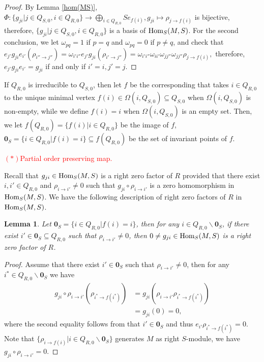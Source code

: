 \documentclass[a4paper, reqno]{amsart}
\newtheorem{lem}[thm]{Lemma}
\theoremstyle{definition}
\theoremstyle{remark}
\numberwithin{equation}{section}
\begin{document}
\begin{proof}
    By Lemma \ref{hom(MS)}, $\Phi: \{g_{ji}|j\in Q_{S,0},i \in Q_{R,0}\}\to \bigoplus_{i\in Q_{R,0}} Se_{f(i)}, g_{ji}\mapsto \rho_{j\to f(i)}$ is bijective, therefore, $\{g_{ji}|j\in Q_{S,0},i \in Q_{R,0}\}$ is a basis of $\textup{Hom}_S(M,S)$. For the second conclusion, we let $ \omega_{pq} =1$ if $ p=q$ and $\omega_{pq} = 0$ if $p\neq q$, and check that $e_{j'}g_{ji}e_{i'}(\rho_{i''\to j''}) =\omega_{i'{i''}} e_{j'}g_{ji}(\rho_{i'\to j''}) =\omega_{i'{i''}} \omega_{i{i'}} \omega_{j{j''}}\omega_{j{j''}}\rho_{j\to f(i)},$ therefore, $e_{j'}g_{ji}e_{i'} = g_{ji}$ if and only if $i'=i, j'=j $. 

\end{proof}

If $Q_{R,0}$ is irreducible to $Q_{S,0}$, then let $f$ be the corresponding that takes $i\in Q_{R,0}$ to the unique minimal vertex $f(i)\in \Omega(i,Q_{S,0})\subseteq Q_{S,0}$ when $\Omega(i,Q_{S,0})$ is non-empty, while we define $f(i) = i$ when $\Omega(i,Q_{S,0})$ is an empty set. Then, we let $f(Q_{R,0}) = \{f(i)|i\in Q_{R,0} \}$ be the image of $f$, $ \mathbf{0}_S = \{i\in Q_{R,0}| f(i) = i\} \subseteq f(Q_{R,0})$ be the set of invariant points of $f$.  




\textcolor{red}{ $(*)$Partial order preserving map.}



Recall that $g_{ji}\in \textup{Hom}_S(M,S)$ is a right zero factor of $R$ provided that there exist $i,i'\in Q_{R,0}$ and $\rho_{i\to i'} \neq 0$ such that $ g_{ji} \circ \rho_{i\to i'}$ is a zero homomorphism in $\textup{Hom}_S(M,S)$. We have the following description of right zero factors of $R$ in $\textup{Hom}_S(M,S)$. 

\begin{lem}  
    Let $ \mathbf{0}_S = \{i\in Q_{R,0}| f(i) = i\} $, then for any $ i\in Q_{R,0}\backslash \mathbf{0}_S $, if there exist $i'\in  \mathbf{0}_S \subseteq Q_{R,0}$ such that $\rho_{i\to i'} \neq 0 $, then $0 \neq g_{ji}\in \textup{Hom}_S(M,S)$ is a right zero factor of $R$.
\end{lem}

\begin{proof}
      Assume that there exist $i'\in \mathbf{0}_S$ such that $\rho_{i\to i'} \neq 0$, then for any ${i}^{*}  \in Q_{R,0}\backslash \mathbf{0}_S $ we have 
    \begin{align*}
        g_{ji}\circ \rho_{i\to i'}( \rho_{{i}^{*}\to f({i}^{*})})  &= g_{ji}(\rho_{i\to i'} \rho_{{i}^{*}\to f({i}^{*})})\\
        &=  g_{ji}(0) =0,
    \end{align*}  
    where the second equality follows from that $i'\in \mathbf{0}_S$ and thus $e_{i'}\rho_{i^{*}\to f(i^{*})} = 0 $. Note that $\{\rho_{i\to f(i)}|i\in Q_{R,0}\backslash \mathbf{0}_S\} $ generates $M$ as right $S$-module, we have $g_{ji}\circ \rho_{i\to i'} = 0$.
\end{proof}
\end{document}
